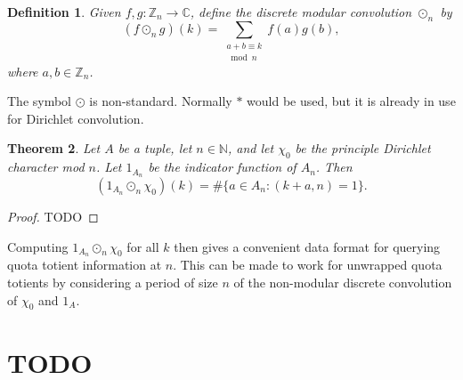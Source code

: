 \documentclass[11pt, leqno]{article}
\newtheorem{theorem}{Theorem}[section]
\newtheorem{definition}[theorem]{Definition}
\begin{document}
\begin{definition}
    Given $f,g : \mathbb{Z}_n \rightarrow \mathbb{C}$,
    define the discrete modular convolution $\odot_n$ by
    $$(f\odot_n g)(k) = \sum_{\substack{a+b\equiv k \\ \bmod n}}f(a)g(b),$$
    where $a,b\in\mathbb{Z}_n$. 
\end{definition}

The symbol $\odot$ is non-standard. 
Normally $\ast$ would be used, but it is already in use for Dirichlet convolution.

\begin{theorem}
    Let $A$ be a tuple,
    let $n\in\mathbb{N}$, and let $\chi_0$ be the principle 
    Dirichlet character mod $n$.
    Let $1_{A_n}$ be the indicator function of $A_n$.
    Then
    $$(1_{A_n}\odot_n\chi_0)(k) = \#\{a \in A_n : (k+a,n)=1\}.$$
\end{theorem}
\begin{proof}
    TODO
\end{proof}

Computing $1_{A_n}\odot_n\chi_0$ for all $k$ then gives a convenient data
format for querying quota totient information at $n$.
This can be made to work for unwrapped quota totients by
considering a period of size $n$ of the non-modular discrete convolution
of $\chi_0$ and $1_A$.



\pagebreak
\section{TODO}


\end{document}
